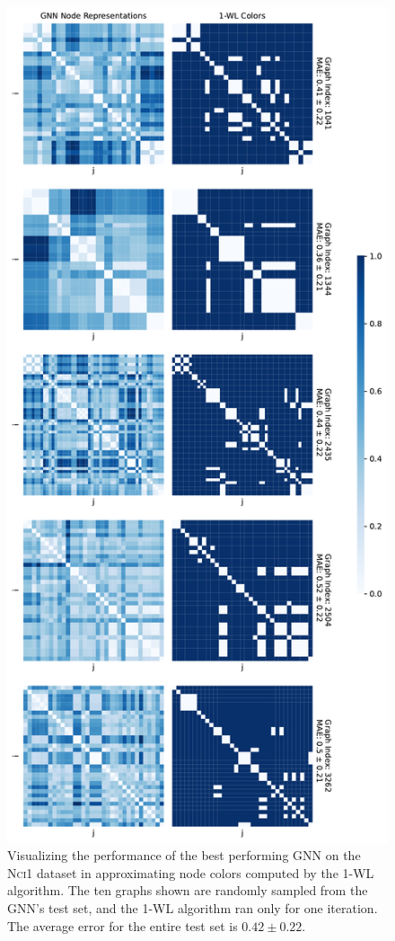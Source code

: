 \begin{figure}[!ht]
\begin{minipage}[b]{0.45992852703\textwidth}
    \end{minipage}
    \hfill
    \begin{minipage}[b]{0.53007147296\textwidth}
        \includegraphics[width=\textwidth, right]{Figures/heatmaps_NCI1_1_k_wl_1.pdf}
    \end{minipage}
    \hfill
    \caption{Visualizing the performance of the best performing GNN on the \textsc{Nci1} dataset in approximating node colors computed by the 1-WL algorithm. The ten graphs shown are randomly sampled from the GNN's test set, and the 1-WL algorithm ran only for one iteration. The average error for the entire test set is $0.42 \pm 0.22$.}
\end{figure}

